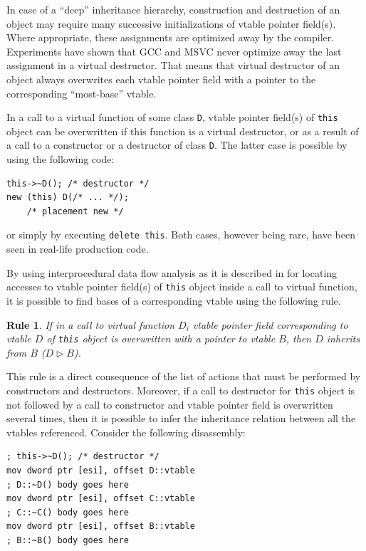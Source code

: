 \documentclass[10pt, conference]{IEEEtran}
\newtheorem{rulez}{Rule}
\newcommand{\listingsize}{\normalsize}
\begin{document}
In case of a ``deep'' inheritance hierarchy,
construction and destruction of an object may require many
successive initializations of vtable pointer field(s).
Where appropriate, these assignments are optimized away by the compiler.
Experiments have shown that GCC and MSVC never optimize away
the last assignment in a virtual destructor.
That means that virtual destructor of an object always overwrites each
vtable pointer field with a pointer to the corresponding ``most-base'' vtable.

In a call to a virtual function of some class \lstinline{D}, vtable pointer field(s) of
\lstinline{this} object can be overwritten if this function is a
virtual destructor, or as a result of a call to a constructor or a destructor of class \lstinline{D}.
The latter case is possible by using the following code:
{
\lstset{basicstyle=\listingsize}
\begin{lstlisting}
this->~D(); /* destructor */
new (this) D(/* ... */); 
    /* placement new */
\end{lstlisting}
}
\noindent or simply by executing \lstinline{delete this}. Both cases, however being rare,
have been seen in real-life production code.

By using interprocedural data flow analysis as it is described in \cite{aho06} for locating accesses
to vtable pointer field(s) of \lstinline{this} object inside a call to virtual function,
it is possible to find bases of a corresponding vtable using the following rule.
\begin{rulez}\label{stmt:destructors}\label{stmt:last_good}
If in a call to virtual function $D_i$ vtable pointer field corresponding to vtable $D$ 
of \lstinline{this} object is
overwritten with a pointer to vtable $B$, then $D$ inherits from $B$ ($D \rhd B$).
\end{rulez}

This rule is a direct consequence of the list of actions that must be
performed by constructors and destructors.
Moreover, if a call to destructor for \lstinline{this} object is
not followed by a call to constructor and vtable pointer field is
overwritten several times, then it is possible to infer the
inheritance relation between all the vtables referenced.
Consider the following disassembly:
{
\lstset{basicstyle=\listingsize, language=[x86masm]Assembler}
\begin{lstlisting}
; this->~D(); /* destructor */
mov dword ptr [esi], offset D::vtable
; D::~D() body goes here
mov dword ptr [esi], offset C::vtable
; C::~C() body goes here
mov dword ptr [esi], offset B::vtable
; B::~B() body goes here
\end{lstlisting}
}
\end{document}
